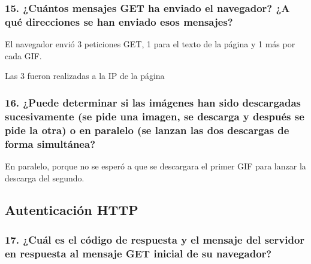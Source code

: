 \documentclass[11pt]{article}
\begin{document}
    \hypertarget{cuuxe1ntos-mensajes-get-ha-enviado-el-navegador-a-quuxe9-direcciones-se-han-enviado-esos-mensajes}{%
\subsubsection{15. ¿Cuántos mensajes GET ha enviado el navegador? ¿A qué
direcciones se han enviado esos
mensajes?}\label{cuuxe1ntos-mensajes-get-ha-enviado-el-navegador-a-quuxe9-direcciones-se-han-enviado-esos-mensajes}}

El navegador envió 3 peticiones GET, 1 para el texto de la página y 1
más por cada GIF.

Las 3 fueron realizadas a la IP de la página

\hypertarget{puede-determinar-si-las-imuxe1genes-han-sido-descargadas-sucesivamente-se-pide-una-imagen-se-descarga-y-despuuxe9s-se-pide-la-otra-o-en-paralelo-se-lanzan-las-dos-descargas-de-forma-simultuxe1nea}{%
\subsubsection{16. ¿Puede determinar si las imágenes han sido
descargadas sucesivamente (se pide una imagen, se descarga y después se
pide la otra) o en paralelo (se lanzan las dos descargas de forma
simultánea?}\label{puede-determinar-si-las-imuxe1genes-han-sido-descargadas-sucesivamente-se-pide-una-imagen-se-descarga-y-despuuxe9s-se-pide-la-otra-o-en-paralelo-se-lanzan-las-dos-descargas-de-forma-simultuxe1nea}}

En paralelo, porque no se esperó a que se descargara el primer GIF para
lanzar la descarga del segundo.

    \hypertarget{autenticaciuxf3n-http}{%
\subsection{Autenticación HTTP}\label{autenticaciuxf3n-http}}

    \hypertarget{cuuxe1l-es-el-cuxf3digo-de-respuesta-y-el-mensaje-del-servidor-en-respuesta-al-mensaje-get-inicial-de-su-navegador}{%
\subsubsection{17. ¿Cuál es el código de respuesta y el mensaje del
servidor en respuesta al mensaje GET inicial de su
navegador?}\label{cuuxe1l-es-el-cuxf3digo-de-respuesta-y-el-mensaje-del-servidor-en-respuesta-al-mensaje-get-inicial-de-su-navegador}}
\end{document}
